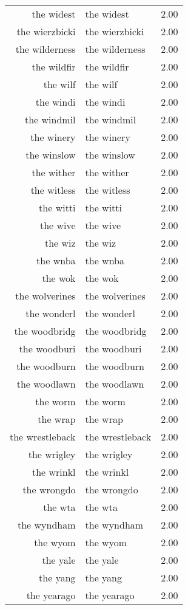 \begin{table}[ht]
\begin{tabular}{rlr}
  the widest & the widest & 2.00 \\ 
  the wierzbicki & the wierzbicki & 2.00 \\ 
  the wilderness & the wilderness & 2.00 \\ 
  the wildfir & the wildfir & 2.00 \\ 
  the wilf & the wilf & 2.00 \\ 
  the windi & the windi & 2.00 \\ 
  the windmil & the windmil & 2.00 \\ 
  the winery & the winery & 2.00 \\ 
  the winslow & the winslow & 2.00 \\ 
  the wither & the wither & 2.00 \\ 
  the witless & the witless & 2.00 \\ 
  the witti & the witti & 2.00 \\ 
  the wive & the wive & 2.00 \\ 
  the wiz & the wiz & 2.00 \\ 
  the wnba & the wnba & 2.00 \\ 
  the wok & the wok & 2.00 \\ 
  the wolverines & the wolverines & 2.00 \\ 
  the wonderl & the wonderl & 2.00 \\ 
  the woodbridg & the woodbridg & 2.00 \\ 
  the woodburi & the woodburi & 2.00 \\ 
  the woodburn & the woodburn & 2.00 \\ 
  the woodlawn & the woodlawn & 2.00 \\ 
  the worm & the worm & 2.00 \\ 
  the wrap & the wrap & 2.00 \\ 
  the wrestleback & the wrestleback & 2.00 \\ 
  the wrigley & the wrigley & 2.00 \\ 
  the wrinkl & the wrinkl & 2.00 \\ 
  the wrongdo & the wrongdo & 2.00 \\ 
  the wta & the wta & 2.00 \\ 
  the wyndham & the wyndham & 2.00 \\ 
  the wyom & the wyom & 2.00 \\ 
  the yale & the yale & 2.00 \\ 
  the yang & the yang & 2.00 \\ 
  the yearago & the yearago & 2.00 \\ 

\end{tabular}
\end{table}
